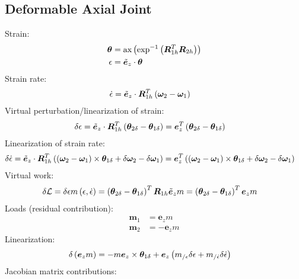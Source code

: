 \documentclass[10pt,fleqn,subeqn]{report}
\newcommand{\T}[1]{\bm{#1}}
\newcommand{\TT}[1]{\bm{#1}}
\begin{document}
\subsection{Deformable Axial Joint}
\label{sec:constraints:deformable:deformable axial joint}
Strain:
\begin{align}
	\T{\theta}
	&=
	\text{ax}\plbr{\text{exp}^{-1}\plbr{\TT{R}_{1h}^T \TT{R}_{2h}}}
	\\
	\epsilon
	&=
	\tilde{\T{e}}_z \cdot \T{\theta}
\end{align}
Strain rate:
\begin{align}
	\dot{\epsilon}
	&=
	\tilde{\T{e}}_z \cdot \TT{R}_{1h}^T\plbr{\T{\omega}_2 - \T{\omega}_1}
\end{align}
Virtual perturbation/linearization of strain:
\begin{align}
	\delta\epsilon
	&=
	\tilde{\T{e}}_z \cdot \TT{R}_{1h}^T\plbr{\T{\theta}_{2\delta} - \T{\theta}_{1\delta}}
	=
	\T{e}_z^T \plbr{\T{\theta}_{2\delta} - \T{\theta}_{1\delta}}
\end{align}
Linearization of strain rate:
\begin{align}
	\delta\dot{\epsilon}
	&=
	\tilde{\T{e}}_z \cdot \TT{R}_{1h}^T\plbr{
		\plbr{\T{\omega}_2 - \T{\omega}_1} \times \T{\theta}_{1\delta}
		+
		\delta\T{\omega}_2
		-
		\delta\T{\omega}_1
	}
	=
	\T{e}_z^T \plbr{
		\plbr{\T{\omega}_2 - \T{\omega}_1} \times \T{\theta}_{1\delta}
		+
		\delta\T{\omega}_2
		-
		\delta\T{\omega}_1
	}
\end{align}
Virtual work:
\begin{align}
	\delta\mathcal{L}
	&=
	\delta\epsilon m\plbr{\epsilon, \dot{\epsilon}}
	=
	\plbr{
		\T{\theta}_{2\delta}
		-
		\T{\theta}_{1\delta}
	}^T
	\TT{R}_{1h}
	\tilde{\T{e}}_z
	m
	=
	\plbr{
		\T{\theta}_{2\delta}
		-
		\T{\theta}_{1\delta}
	}^T
	\T{e}_z
	m
\end{align}
Loads (residual contribution):
\begin{subequations}
\begin{align}
	\T{m}_1
	&=
	\T{e}_z m
	\\
	\T{m}_2
	&=
	- \T{e}_z m
\end{align}
\end{subequations}
Linearization:
\begin{align}
	\delta\plbr{\T{e}_z m}
	&=
	- m \T{e}_z \times \T{\theta}_{1\delta}
	+
	\T{e}_z \plbr{
		m_{/\epsilon} \delta\epsilon
		+
		m_{/\dot{\epsilon}} \delta\dot{\epsilon}
	}
\end{align}
Jacobian matrix contributions:
\end{document}
